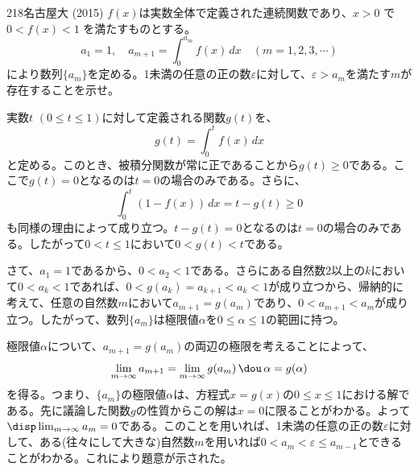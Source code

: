 \begin{prob}{218}{}{名古屋大 (2015)}
 $f(x)$は実数全体で定義された連続関数であり、$x>0$ で $0<f(x)<1$ を満たすものとする。
 \[ a_1=1,\quad a_{m+1}=\int_0^{a_m}\! f(x) \,dx \quad (m=1, 2, 3, \cdots) \]
 により数列$\{a_m\}$を定める。1未満の任意の正の数$\varepsilon$に対して、$\varepsilon>a_m$を満たす$m$が存在することを示せ。
\end{prob}
実数$t$ $(0\le t \le 1)$に対して定義される関数$g(t)$を、
\[ g(t) = \int_0^t\! f(x) \,dx \]
と定める。このとき、被積分関数が常に正であることから$g(t)\ge0$である。ここで$g(t)=0$となるのは$t=0$の場合のみである。さらに、
\[ \int_0^t\! \left(1-f(x)\right) \,dx = t-g(t) \ge0 \]
も同様の理由によって成り立つ。$t-g(t)=0$となるのは$t=0$の場合のみである。したがって$0 < t \le1$において$0<g(t)<t$である。

さて、$a_1=1$であるから、$0<a_2<1$である。さらにある自然数2以上の$k$において$0<a_k<1$であれば、$0<g(a_k)=a_{k+1}<a_k<1$が成り立つから、帰納的に考えて、任意の自然数$m$において$a_{m+1}=g(a_m)$であり、$0<a_{m+1}<a_m$が成り立つ。したがって、数列$\{a_m\}$は極限値$\alpha$を$0\le\alpha\le1$の範囲に持つ。

極限値$\alpha$について、$a_{m+1}=g(a_m)$の両辺の極限を考えることによって、
\[ \lim_{m\to\infty} a_{m+1}=\lim_{m\to\infty} g(a_m) \,\dou\, \alpha=g(\alpha) \]
を得る。つまり、$\{a_m\}$の極限値$\alpha$は、方程式$x=g(x)$の$0\le x\le 1$における解である。先に議論した関数$g$の性質からこの解は$x=0$に限ることがわかる。よって$\disp \lim_{m\to\infty} a_m=0$である。このことを用いれば、1未満の任意の正の数$\varepsilon$に対して、ある(往々にして大きな)自然数$m$を用いれば$0<a_m<\varepsilon\le a_{m-1}$とできることがわかる。これにより題意が示された。

